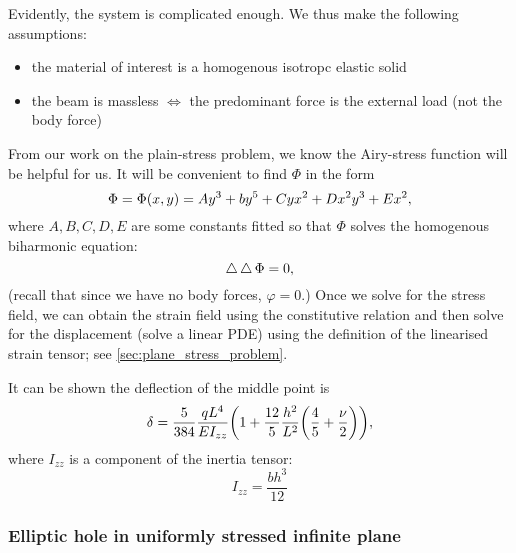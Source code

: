 \documentclass[../main.tex]{subfiles}
\begin{document}
Evidently, the system is complicated enough. We thus make the following assumptions:

\begin{itemize}
	\item the material of interest is a homogenous isotropc elastic solid
	\item the beam is massless $\Leftrightarrow$ the predominant force is the external load (not the body force)
\end{itemize}

From our work on the plain-stress problem, we know the Airy-stress function will be helpful for us. It will be convenient to find $\Phi$ in the form
\[
	\Phi = \Phi\qty(x,y) = A y^{3} + b y^5 + C yx^{2}+ D x^{2}y^{3}+Ex^{2},
\]
where $A,B,C,D,E$ are some constants fitted so that $\Phi$ solves the homogenous biharmonic equation: 
\[
	\operatorname{\bigtriangleup} \operatorname{\bigtriangleup} \Phi = 0,
\]
(recall that since we have no body forces, $\varphi = 0.$) Once we solve for the stress field, we can obtain the strain field using the constitutive relation and then solve for the displacement (solve a linear PDE) using the definition of the linearised strain tensor; see \ref{sec:plane_stress_problem}.

It can be shown the deflection of the middle point is 
\[
	\delta = \frac{5}{384}\frac{qL^4}{EI_{zz}}\qty(1+\frac{12}{5}\frac{h^{2}}{L^{2}}\qty(\frac{4}{5}+\frac{\nu}{2})),
\]
where $I_{zz}$ is a component of the inertia tensor:
\[
	I_{zz} = \frac{bh^{3}}{12}
\]

\subsubsection{Elliptic hole in uniformly stressed infinite plane}
\label{sec:elliptic_hole}
\end{document}
